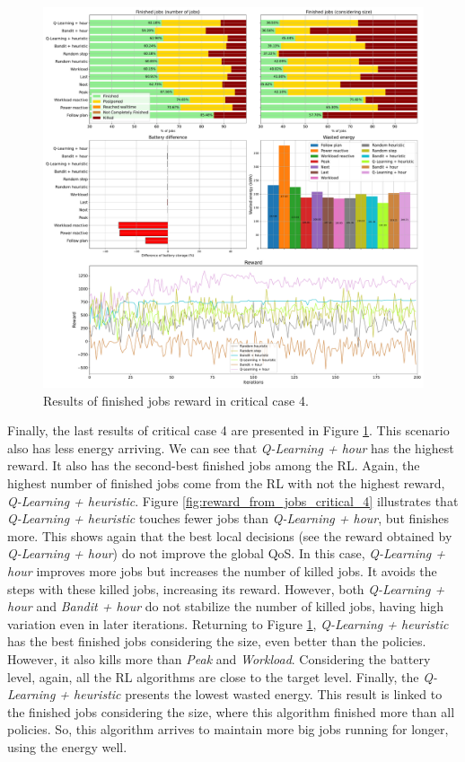 \begin{figure}[!htb]
    \centering
    \includegraphics[scale=0.29]{Images/Learning_compensations/reward_finished_touched_profile_worst_workload_2_with_noise_state_delta.pdf}
    \caption{Results of finished jobs reward in critical case 4.}
    \label{fig:touched_reward_results_critical_4}
\end{figure}

Finally, the last results of critical case 4 are presented in Figure \ref{fig:touched_reward_results_critical_4}. This scenario also has less energy arriving. We can see that \emph{Q-Learning + hour} has the highest reward. It also has the second-best finished jobs among the RL. Again, the highest number of finished jobs come from the RL with not the highest reward, \emph{Q-Learning + heuristic}. Figure \ref{fig:reward_from_jobs_critical_4} illustrates that \emph{Q-Learning + heuristic} touches fewer jobs than \emph{Q-Learning + hour}, but finishes more. This shows again that the best local decisions (see the reward obtained by \emph{Q-Learning + hour}) do not improve the global QoS. In this case, \emph{Q-Learning + hour} improves more jobs but increases the number of killed jobs. It avoids the steps with these killed jobs, increasing its reward. However, both \emph{Q-Learning + hour} and \emph{Bandit + hour} do not stabilize the number of killed jobs, having high variation even in later iterations. Returning to Figure \ref{fig:touched_reward_results_critical_4}, \emph{Q-Learning + heuristic} has the best finished jobs considering the size, even better than the policies. However, it also kills more than \emph{Peak} and \emph{Workload}. Considering the battery level, again, all the RL algorithms are close to the target level. Finally, the \emph{Q-Learning + heuristic} presents the lowest wasted energy. This result is linked to the finished jobs considering the size, where this algorithm finished more than all policies. So, this algorithm arrives to maintain more big jobs running for longer, using the energy well.

